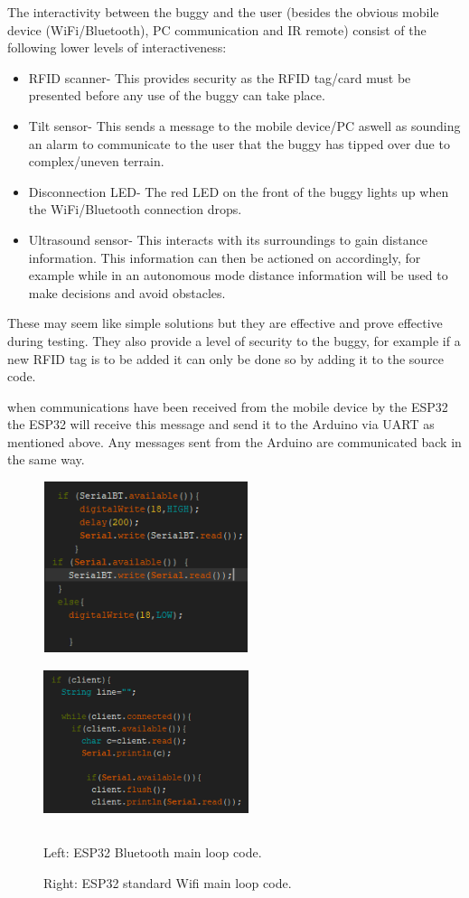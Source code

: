 \documentclass[8pt, a4paper]{article}
\begin{document}
The interactivity between the buggy and the user (besides the obvious mobile device (WiFi/Bluetooth), PC communication and IR remote) consist of the following lower levels of interactiveness:

\begin{itemize}
	\item RFID scanner- This provides security as the RFID tag/card must be presented before any use of the buggy can take place. 
	\item Tilt sensor- This sends a message to the mobile device/PC aswell as sounding an alarm to communicate to the user that the buggy has tipped over due to complex/uneven terrain. 
	\item Disconnection LED- The red LED on the front of the buggy lights up when the WiFi/Bluetooth connection drops.  
	\item Ultrasound sensor- This interacts with its surroundings to gain distance information. This information can then be actioned on accordingly, for example while in an autonomous mode distance information will be used to make decisions and avoid obstacles. 
\end{itemize}
These may seem like simple solutions but they are effective and prove effective during testing. They also provide a level of security to the buggy, for example if a new RFID tag is to be added it can only be done so by adding it to the source code.  

when communications have been received from the mobile device by the ESP32 the ESP32 will receive this message and send it to the Arduino via UART as mentioned above. Any messages sent from the Arduino are communicated back in the same way. 
 
\begin{figure}[H]
	\centering
	\includegraphics[height=5.0cm, width=6.0cm]{bluetooth}
	\includegraphics[height=5.0cm, width=6.0cm]{standard_wifi}
	\caption{Left: ESP32 Bluetooth main loop code.}
	\caption{Right: ESP32 standard Wifi main loop code.}
\end{figure}
\end{document}
